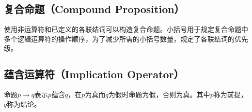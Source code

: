 \documentclass[12pt, openany, oneside]{book}
\begin{document}
\subsection{复合命题（Compound Proposition）}

使用非运算符和已定义的各联结词可以构造复合命题。小括号用于规定复合命题中多个逻辑运算符的操作顺序，为了减少所需的小括号数量，规定了各联结词的优先级。

\begin{table}[H]
	\centering
	\caption{运算符优先级}
\end{table}

\vspace{0.5cm}

\subsection{蕴含运算符（Implication Operator）}

命题$ p \rightarrow q $表示$ p $蕴含$ q $，在$ p $为真而$ q $为假时命题为假，否则为真。其中$ p $称为前提，$ q $称为结论。

\begin{table}[H]
	\centering
	\caption{蕴含真值表}
\end{table}
\end{document}
